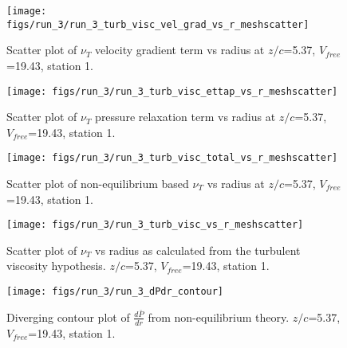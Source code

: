 \begin{figure}[H]
\centering
\texttt{[image: figs/run\_3/run\_3\_turb\_visc\_vel\_grad\_vs\_r\_meshscatter]}
\caption{Scatter plot of $\nu_T$ velocity gradient term vs radius at $z/c$=5.37, $V_{free}$=19.43, station 1.}
\end{figure}


\begin{figure}[H]
\centering
\texttt{[image: figs/run\_3/run\_3\_turb\_visc\_ettap\_vs\_r\_meshscatter]}
\caption{Scatter plot of $\nu_T$ pressure relaxation term vs radius at $z/c$=5.37, $V_{free}$=19.43, station 1.}
\end{figure}


\begin{figure}[H]
\centering
\texttt{[image: figs/run\_3/run\_3\_turb\_visc\_total\_vs\_r\_meshscatter]}
\caption{Scatter plot of non-equilibrium based $\nu_T$ vs radius at $z/c$=5.37, $V_{free}$=19.43, station 1.}
\end{figure}


\begin{figure}[H]
\centering
\texttt{[image: figs/run\_3/run\_3\_turb\_visc\_vs\_r\_meshscatter]}
\caption{Scatter plot of $\nu_T$ vs radius as calculated from the turbulent viscosity hypothesis. $z/c$=5.37, $V_{free}$=19.43, station 1.}
\end{figure}


\begin{figure}[H]
\centering
\texttt{[image: figs/run\_3/run\_3\_dPdr\_contour]}
\caption{Diverging contour plot of $\frac{d\bar{P}}{dr}$ from non-equilibrium theory. $z/c$=5.37, $V_{free}$=19.43, station 1.}
\end{figure}


